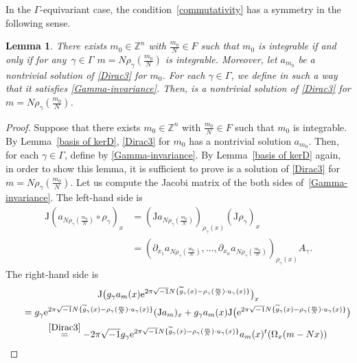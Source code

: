 \documentclass[pdftex]{sigma}
\numberwithin{equation}{section}
\newtheorem{Lemma}[Theorem]{Lemma}
\newcommand{\Z}{\mathbb{Z}}
\renewcommand{\tilde}{\widetilde}
\def\J{\mathrm{J}}
\begin{document}
In the $\Gamma$-equivariant case, the condition~\eqref{commutativity} has a symmetry in the following sense.
\begin{Lemma}\label{equiv commutativity}
There exists $m_0\in \Z^n$  with $\frac{m_0}{N}\in F$ such that $m_0$ is integrable if and only if for any~${\gamma\in \Gamma}$ $m=N\rho_\gamma (\frac{m_0}{N})$
is integrable. Moreover, let $a_{m_0}$ be a nontrivial solution of \eqref{Dirac3} for $m_0$. For each $\gamma \in \Gamma$, we define  in such a way that it satisfies \eqref{Gamma-invariance}. Then,  is a nontrivial solution of \eqref{Dirac3} for $m=N\rho_\gamma (\frac{m_0}{N})$.
\end{Lemma}
\begin{proof}
Suppose that there exists $m_0\in \Z^n$ with $\frac{m_0}{N}\in F$ such that $m_0$ is integrable. By Lemma~\ref{basis of kerD}, \eqref{Dirac3} for $m_0$ has a nontrivial solution $a_{m_0}$. Then, for each $\gamma \in \Gamma$, define  by \eqref{Gamma-invariance}. By Lemma~\ref{basis of kerD} again, in order to show this lemma, it is sufficient to prove  is a solution of \eqref{Dirac3} for $m=N\rho_\gamma (\frac{m_0}{N})$. Let us compute the Jacobi matrix of the both sides of~\eqref{Gamma-invariance}. The left-hand side is
\begin{align}
\J (a_{N\rho_\gamma (\frac{m_0}{N})}\circ \rho_\gamma )_x
&= (\J a_{N\rho_\gamma (\frac{m_0}{N})} )_{\rho_\gamma(x)} (\J \rho_\gamma )_x\nonumber \\
&= (\partial_{x_1}a_{N\rho_\gamma (\frac{m_0}{N})}, \ldots , \partial_{x_n}a_{N\rho_\gamma (\frac{m_0}{N})} )_{\rho_\gamma (x)}A_\gamma . \label{LHS}
\end{align}
The right-hand side is
\begin{gather}
\J \bigl(g_\gamma a_m(x){\rm e}^{2\pi\sqrt{-1}N\{ {\tilde g}_\gamma(x)-\rho_\gamma(\frac{m}{N})\cdot u_\gamma (x)\}}\bigr)_x \nonumber\\
\qquad=g_\gamma {\rm e}^{2\pi\sqrt{-1}N\{ {\tilde g}_\gamma(x)-\rho_\gamma(\frac{m}{N})\cdot u_\gamma (x)\}}(\J a_m)_x +g_\gamma a_m(x)\J \bigl( {\rm e}^{2\pi\sqrt{-1}N\{ {\tilde g}_\gamma(x)-\rho_\gamma(\frac{m}{N})\cdot u_\gamma (x)\}}\bigr) \nonumber \\
\qquad\stackrel{\eqref{Dirac3}}{=}-2\pi\sqrt{-1}g_\gamma {\rm e}^{2\pi\sqrt{-1}N\{ {\tilde g}_\gamma(x)-\rho_\gamma(\frac{m}{N})\cdot u_\gamma (x)\}}a_m(x) {}^t(\Omega_x(m-Nx))\nonumber \\

\end{gather}
\end{proof}
\end{document}
